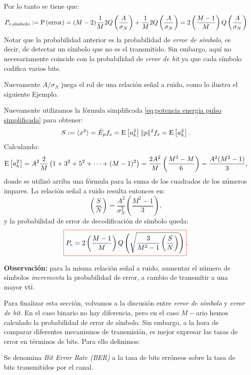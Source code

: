 Por lo tanto se tiene que:
\begin{equation}\label{eq:error polar m-ario gaussiano}
    P_{e,\text{símbolo}}:=\mathrm{P}\left(\text{error}\right) = (M-2) \frac{1}{M} 2Q\left(\frac{A}{\sigma_N}\right) + \frac{1}{M}2Q\left(\frac{A}{\sigma_N}\right) = 2\left(\frac{M-1}{M}\right)Q\left(\frac{A}{\sigma_N}\right)
\end{equation}
Notar que la probabilidad anterior es la probabilidad de \emph{error de símbolo}, es decir, de detectar un símbolo que no es el transmitido. Sin embargo, aquí no necesariamente coincide con la probabilidad de \emph{error de bit} ya que cada símbolo codifica varios bits.

Nuevamente $A/\sigma_N$ juega el rol de una relación señal a ruido, como lo ilustra el siguiente Ejemplo.

\begin{ejemplo}
    Nuevamente utilizamos la fórmula simplificada \eqref{eq:potencia energia pulso simplificada} para obtener:
    \begin{equation*}
        S := \langle x^2 \rangle = \bar{E}_p f_s = \mathrm{E}\left[a_k^2\right] \|p\|^2 f_s = \mathrm{E}\left[a_k^2\right].
    \end{equation*}
    Calculando:
    \begin{equation*}
    \mathrm{E}\left[a_k^2\right]=A^2\frac{2}{M}\left(1+3^2+5^2+\cdots+(M-1)^2\right) = \frac{2A^2}{M}\left(\frac{M^3-M}{6}\right) = \frac{A^2(M^2-1)}{3},
    \end{equation*}
    donde se utilizó arriba una fórmula para la suma de los cuadrados de los números impares. La relación señal a ruido resulta entonces en:
    \begin{equation*}
        \left(\frac{S}{N}\right)=\frac{A^2}{\sigma_N^2}\left(\frac{M^2-1}{3}\right),
    \end{equation*}
    y la probabilidad de error de decodificación de símbolo queda:
    \begin{equation}\label{eq:prob error simbolo m-ario}
        {\col{P_e=2\left(\frac{M-1}{M}\right)Q\left(\sqrt{\frac{3}{M^2-1}\left(\frac{S}{N}\right)}\right)}.}
    \end{equation}

    \textbf{Observación: }para la misma relación señal a ruido, aumentar el número de símbolos \emph{incrementa} la probabilidad de error, a cambio de transmitir a una mayor $\mathrm{vti}$.
\end{ejemplo}

Para finalizar esta sección, volvamos a la discusión entre \emph{error de símbolo} y \emph{error de bit}. En el caso binario no hay diferencia, pero en el caso $M-$ario hemos calculado la probabilidad de error de símbolo. Sin embargo, a la hora de comparar diferentes mecanismos de transmisión, es mejor expresar las tasas de error en términos de bits. Para ello definimos:
\begin{definicion}
    Se denomina \emph{Bit Error Rate (BER)} a la tasa de bits erróneos sobre la tasa de bits transmitidos por el canal.
\end{definicion}

